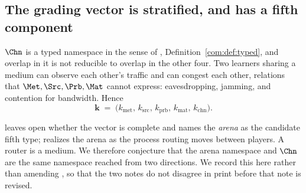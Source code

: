 \begin{table}[t]
\centering\small
{}
\caption{The hierarchy as a shutoff sequence. Each row is a level boundary,
identified by which component of the grading vector has gone to zero and
whether merger is still available. The ordering is
Observation~\ref{eng:obs:order}; the availability of $\Merge$ is
Proposition~\ref{eng:prop:indiv}.}
\label{eng:tab:levels}
\end{table}

\subsection{The grading vector is stratified, and has a fifth component}\label{eng:S9.3}

\begin{proposition}\label{eng:prop:fifth}
$\Chn$ is a typed namespace in the sense of
\chComp, Definition~\ref{com:def:typed}, and overlap in it is not reducible to overlap in
the other four. Two learners sharing a medium can observe each other's
traffic and can congest each other, relations that
$\Met, \Src, \Prb, \Mat$ cannot express: eavesdropping, jamming, and
contention for bandwidth. Hence
\[
  \mathbf{k} \;=\; \bigl(k_{\mathrm{met}},\, k_{\mathrm{src}},\,
  k_{\mathrm{prb}},\, k_{\mathrm{mat}},\, k_{\mathrm{chn}}\bigr).
\]
\end{proposition}

\begin{remark}\label{eng:this-very-likely-arena}
\chComp leaves open whether the vector is complete and names the
\emph{arena} as the candidate fifth type; \chGame realizes the arena
as the process routing moves between players. A router is a medium. We
therefore conjecture that the arena namespace and $\Chn$ are the same
namespace reached from two directions. We record this here rather than
amending \chComp, so that the two notes do not disagree in print
before that note is revised.
\end{remark}

